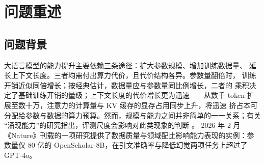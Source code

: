 \documentclass[bwprint]{gmcmthesis}
\numberwithin{equation}{section}
\numberwithin{figure}{section}
\numberwithin{table}{section}
\begin{document}
\begin{abstract}
针对问题四，本文建立了把能力增长分解为规模扩张与非规模技术进步两部分的建模框架，
并给出以 Loss--Benchmark 桥接数据把交叉熵损失翻译为能力得分的技术路线；该问所需的
C 组数据尚未完成建模，本文如实说明其数据要求与识别条件，不给出未经数据支持的结论。

综合来看，本文的方法性贡献有三：其一，把跨来源数据能否合并本身作为受检验的门禁，
而不是默认其可比；其二，对未识别的参数一律报告为未估计，不以待估系数填充结论；
其三，在每一问上都给出失效边界，明确指出结论在何处成立、超出何处失效。主要边界是
质量评分受 7 个语义未追溯字段的约束、配比与质量的独立效应在本数据下不可识别，以及
配比模型不具备跨尺度定量外推能力。


\end{abstract}

\pagestyle{plain}

\maketoc

\clearpage

\section{问题重述}


\subsection{问题背景}

大语言模型的能力提升主要依赖三条途径：扩大参数规模、增加训练数据量、
延长上下文长度。三者均需付出算力代价，且代价结构各异。参数量翻倍时，
训练开销近似同倍增长；按经典估计，数据量应与参数量同比例增长，二者的
乘积决定了基础训练开销的量级；上下文长度的代价增长更为迅速——从数千
token 扩展至数十万，注意力的计算量与 KV 缓存的显存占用同步上升，将迅速
挤占本可分配给参数与数据的算力预算。然而，规模与能力之间并非简单的一一关系；有关
“涌现能力”的研究指出，评测尺度会影响对此类现象的判断 \cite{schaeffer_emergent_2023}。
2026 年 2 月《Nature》刊载的一项研究提供了数据质量与领域配比影响能力表现的实例：参数量仅 80 亿的
OpenScholar-8B，在引文准确率与降低幻觉两项任务上超过了 GPT-4o\cite{asai_synthesizing_2026}。
\end{document}

